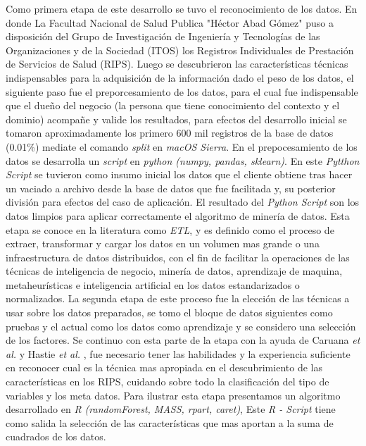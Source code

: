 Como primera etapa de este desarrollo se tuvo el reconocimiento de los datos. En donde La Facultad Nacional de Salud Publica "Héctor Abad Gómez" puso a disposición del Grupo de Investigación de Ingeniería y Tecnologías de las Organizaciones y de la Sociedad (ITOS) los Registros Individuales de Prestación de Servicios de Salud (RIPS).
Luego se descubrieron las características técnicas indispensables para la adquisición de la información dado el peso de los datos, el siguiente paso fue el preporcesamiento de los datos, para el cual fue indispensable que el dueño del negocio (la persona que tiene conocimiento del contexto y el dominio) acompañe y valide los resultados, para efectos del desarrollo inicial se tomaron aproximadamente los primero 600 mil registros de la base de datos (0.01\%)  mediate el comando \emph{split} en \textit{macOS Sierra}.
En el prepocesamiento de los datos se desarrolla un \textit{script} en \textit{python (numpy, pandas, sklearn)}. En este  \textit{Pytthon Script}  se tuvieron como insumo inicial los datos que el cliente obtiene tras hacer un vaciado a archivo desde la base de datos que fue facilitada y, su posterior división para efectos del caso de aplicación. El resultado del \textit{Python Script}  son los datos limpios para aplicar correctamente el algoritmo de minería de datos.
Esta etapa se conoce en la literatura como \textit{ETL}, y es definido como el proceso de extraer, transformar y cargar los datos en un volumen mas grande o una infraestructura de datos distribuidos, con el fin de facilitar la operaciones de las técnicas de inteligencia de negocio, minería de datos, aprendizaje de maquina, metaheurísticas e inteligencia artificial en los datos estandarizados o normalizados.
La segunda etapa de este proceso fue la elección de las técnicas a usar sobre los datos preparados, se  tomo el bloque de datos siguientes como pruebas y el actual como los datos como aprendizaje y se considero una selección de los factores. Se continuo  con esta parte de la etapa con la ayuda de  Caruana \textit{et al.}\cite{Caruana2006} y Hastie \textit{et al.} \cite{Hastie2009}, fue necesario tener las habilidades y la experiencia suficiente en reconocer cual es la técnica mas apropiada en el descubrimiento de las características en los RIPS, cuidando sobre todo  la clasificación del tipo de variables y los meta datos. Para ilustrar esta etapa presentamos un algoritmo desarrollado en \textit{R (randomForest, MASS, rpart, caret)}, Este \textit{R - Script} tiene como salida la selección de las características que mas aportan a la suma de cuadrados de los datos.
